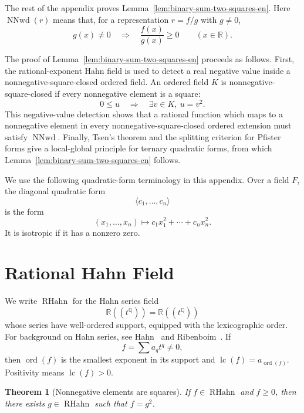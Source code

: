 \documentclass[uplatex,dvipdfmx]{jsarticle}
\newcommand{\RationalHahn}{\operatorname{RHahn}}
\newcommand{\Hahn}{\mathbb{R}((t^{\mathbb{Q}}))}
\newcommand{\lc}{\operatorname{lc}}
\newcommand{\ord}{\operatorname{ord}}
\newcommand{\NNwd}{\operatorname{NNwd}}
\newcommand{\restateprefix}{}
\theoremstyle{matrixsosdefinition}
\newtheorem{theorem}{Theorem}
\begin{document}
The rest of the appendix proves Lemma~\ref{lem:binary-sum-two-squares-en}.
{\renewcommand{\restateprefix}{Restated; }\binarySumTwoSquares*}
Here \(\NNwd(r)\) means that, for a representation \(r=f/g\) with \(g\ne0\),
\[
  g(x)\ne0 \quad\Longrightarrow\quad \frac{f(x)}{g(x)}\ge0
  \qquad (x\in\mathbb{R}).
\]

The proof of Lemma~\ref{lem:binary-sum-two-squares-en} proceeds as follows.
First, the rational-exponent Hahn field is used to detect a real negative value
inside a nonnegative-square-closed ordered field.  An ordered field \(K\) is
nonnegative-square-closed if every nonnegative element is a square:
\[
  0\le u \quad\Longrightarrow\quad \exists v\in K,\ u=v^2.
\]
This negative-value detection shows that a rational function which maps to a
nonnegative element in every nonnegative-square-closed ordered extension must
satisfy \(\NNwd\).  Finally, Tsen's theorem and the splitting criterion for
Pfister forms give a local-global principle for ternary quadratic forms, from
which Lemma~\ref{lem:binary-sum-two-squares-en} follows.

We use the following quadratic-form terminology in this appendix.  Over a field
\(F\), the diagonal quadratic form
\[
  \langle c_1,\ldots,c_n\rangle
\]
is the form
\[
  (x_1,\ldots,x_n)\longmapsto c_1x_1^2+\cdots+c_nx_n^2.
\]
It is isotropic if it has a nonzero zero.

\section{Rational Hahn Field}\label{sec:hahn-start-en}

We write \(\RationalHahn\) for the Hahn series field
\[
  \Hahn=\mathbb{R}((t^{\mathbb{Q}}))
\]
whose series have well-ordered support, equipped with the lexicographic
order.  For background on Hahn series, see
Hahn~\cite{Hahn1907} and Ribenboim~\cite{RibenboimFields}. If
\[
  f=\sum a_qt^q\ne0,
\]
then \(\ord(f)\) is the smallest exponent in its support and
\(\lc(f)=a_{\ord(f)}\). Positivity means \(\lc(f)>0\).

\begin{theorem}[Nonnegative elements are squares]
  If \(f\in\RationalHahn\) and \(f\ge0\), then there exists
  \(g\in\RationalHahn\) such that \(f=g^2\).
\end{theorem}
\end{document}
